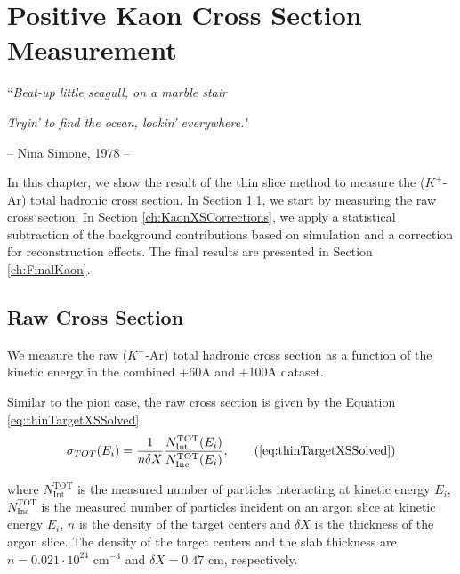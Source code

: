 \chapter{Positive Kaon Cross Section Measurement}\label{ch:KaonXS}
{\raggedleft ``\emph{Beat-up little seagull, on a marble stair} \par}
{\raggedleft \emph{Tryin' to find the ocean, lookin' everywhere.}"\par}
{\raggedleft -- Nina Simone, 1978 -- \par}%
\vspace{0.5cm}

In this chapter, we show the result of the thin slice method to measure  the ($K^+$-Ar) total hadronic cross section. In Section \ref{ch:KaonXSRaw}, we start by measuring the raw cross section. In Section \ref{ch:KaonXSCorrections}, we apply a statistical subtraction of the background contributions based on simulation and a correction for reconstruction effects. The final results are presented in Section \ref{ch:FinalKaon}.


\section{Raw Cross Section}\label{ch:KaonXSRaw}
We measure the raw ($K^+$-Ar) total hadronic cross section as a function of the kinetic energy in the combined +60A and +100A dataset. 

Similar to the pion case,  the raw cross section is given by the Equation \ref{eq:thinTargetXSSolved}
\begin{equation}
 \sigma_{TOT} (E_i)  = \frac{1}{n \delta X}\frac{N^{\text{TOT}}_{\text{Int}}(E_i)}{N^{\text{TOT}}_{\text{Inc}}(E_i)}, \tag{\ref{eq:thinTargetXSSolved}}
\end{equation}

where $N^{\text{TOT}}_{\text{Int}}$  is the measured number of particles interacting at kinetic energy $E_i$, $N^{\text{TOT}}_{\text{Inc}}$ is the  measured  number of particles incident  on an argon slice at  kinetic energy $E_i$,  $n$ is the density of the target centers  and $\delta X$ is the thickness of the argon slice. The density of the target centers and the slab thickness are $n = 0.021\cdot10^{24} \text{ cm}^{-3} $ and  $\delta X=0.47\text{ cm}$, respectively.



